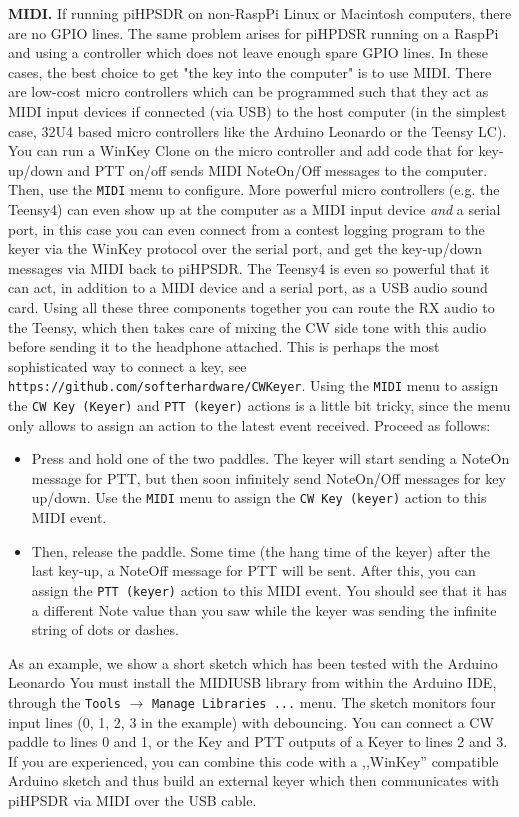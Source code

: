 \documentclass[12pt]{book}
\def\bltt#1{\texttt{\color{blue}#1}}
\def\pH{pi\-HPSDR\xspace}
\begin{document}
\textbf{MIDI.}
If running \pH on non-RaspPi Linux or Macintosh computers, there are no GPIO
lines. The same problem arises for piHPDSR running on a RaspPi and using a controller
which does not leave enough spare GPIO lines. In these cases, the best
choice to get "the key into the computer" is to use MIDI. There are low-cost
micro controllers which can be programmed such that they act as MIDI input devices
if connected (via USB) to the host computer (in the simplest case, 32U4 based
micro controllers like the Arduino Leonardo or the Teensy LC). You can
run a WinKey Clone on the micro controller and add code that for key-up/down and
PTT on/off sends MIDI NoteOn/Off messages to the computer. Then, use the
\bltt{MIDI} menu to configure. More powerful micro controllers (e.g. the Teensy4)
can even show up at the computer as a MIDI input device \textit{and} a serial port,
in this case you can even connect from a contest logging program to  the keyer
via the WinKey protocol over the serial port, and get the key-up/down messages
via MIDI back to \pH. The Teensy4 is even so powerful that it can act, in
addition to a MIDI device and a serial port, as a USB audio sound card.
Using all these three components together you can route the RX audio to the
Teensy, which then takes care of mixing the CW side tone with this audio
before sending it to the headphone attached. This is perhaps the most
sophisticated way to connect a key, see \texttt{https://github.com/softerhardware/CWKeyer}.
Using the \bltt{MIDI} menu to assign the \bltt{CW Key (Keyer)} and \bltt{PTT (keyer)}
actions is a little bit tricky, since the menu only allows to assign an action to
the latest event received. Proceed as follows:

\begin{itemize}
\item{Press and hold one of the two paddles. The keyer will start sending a NoteOn
message for PTT, but then soon infinitely send NoteOn/Off messages for key up/down.
Use the \bltt{MIDI} menu to assign the \bltt{CW Key (keyer)} action to this MIDI event.}
\item{Then, release the paddle. Some time (the hang time of the keyer) after the last
key-up, a NoteOff message for PTT will be sent. After this, you can assign the
\bltt{PTT (keyer)} action to this MIDI event. You should see that it has a different
Note value than you saw while the keyer was sending the infinite string of dots or
dashes.}
\end{itemize}

As an example, we show a short sketch which has been tested with the Arduino Leonardo
You must install the MIDIUSB library from within the Arduino IDE, through the
\texttt{Tools} $\to$ \texttt{Manage Libraries ...}  menu. The sketch monitors four
input lines (0, 1, 2, 3 in the example) with debouncing. You can connect a CW paddle
to lines 0 and 1, or the Key and PTT outputs of a Keyer to lines 2 and 3.
If you are experienced, you can combine this code with a ,,WinKey'' compatible
Arduino sketch and thus build an external keyer which then communicates with \pH
via MIDI over the USB cable.
\end{document}
